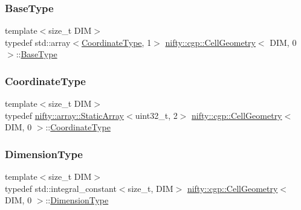 \subsubsection{\texorpdfstring{Base\+Type}{BaseType}}
{\footnotesize\ttfamily template$<$size\+\_\+t D\+IM$>$ \\
typedef std\+::array$<$\hyperlink{classnifty_1_1cgp_1_1CellGeometry_3_01DIM_00_010_01_4_a3c8cec60edc558f44940e98135a521f0}{Coordinate\+Type}, 1$>$ \hyperlink{classnifty_1_1cgp_1_1CellGeometry}{nifty\+::cgp\+::\+Cell\+Geometry}$<$ D\+IM, 0 $>$\+::\hyperlink{classnifty_1_1cgp_1_1CellGeometry_3_01DIM_00_010_01_4_a299d8c228b7529d2e95f90aa3b2f7528}{Base\+Type}}

\mbox{\label{classnifty_1_1cgp_1_1CellGeometry_3_01DIM_00_010_01_4_a3c8cec60edc558f44940e98135a521f0}} 
\subsubsection{\texorpdfstring{Coordinate\+Type}{CoordinateType}}
{\footnotesize\ttfamily template$<$size\+\_\+t D\+IM$>$ \\
typedef \hyperlink{namespacenifty_1_1array_a683f151f19c851754e0c6d55ed16a0c2}{nifty\+::array\+::\+Static\+Array}$<$uint32\+\_\+t, 2$>$ \hyperlink{classnifty_1_1cgp_1_1CellGeometry}{nifty\+::cgp\+::\+Cell\+Geometry}$<$ D\+IM, 0 $>$\+::\hyperlink{classnifty_1_1cgp_1_1CellGeometry_3_01DIM_00_010_01_4_a3c8cec60edc558f44940e98135a521f0}{Coordinate\+Type}}

\mbox{\label{classnifty_1_1cgp_1_1CellGeometry_3_01DIM_00_010_01_4_a71116d45ef5d2db3ccf29b0258df02ed}} 
\subsubsection{\texorpdfstring{Dimension\+Type}{DimensionType}}
{\footnotesize\ttfamily template$<$size\+\_\+t D\+IM$>$ \\
typedef std\+::integral\+\_\+constant$<$size\+\_\+t, D\+IM$>$ \hyperlink{classnifty_1_1cgp_1_1CellGeometry}{nifty\+::cgp\+::\+Cell\+Geometry}$<$ D\+IM, 0 $>$\+::\hyperlink{classnifty_1_1cgp_1_1CellGeometry_3_01DIM_00_010_01_4_a71116d45ef5d2db3ccf29b0258df02ed}{Dimension\+Type}}

